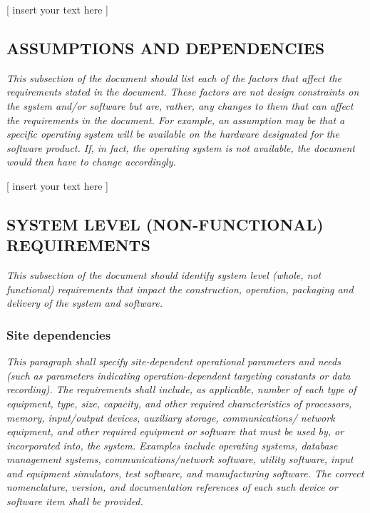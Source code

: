 \documentclass[twoside,letterpaper]{article}
\begin{document}
[ insert your text here ]

\subsection[ASSUMPTIONS AND DEPENDENCIES]{\rmfamily\bfseries ASSUMPTIONS AND
DEPENDENCIES}
\hypertarget{RefHeading18059017292}{}{\itshape
This subsection of the document should list each of the factors
that affect the requirements stated in the document. These factors
are not design constraints on the system and/or software but are,
rather, any changes to them that can affect the requirements in the
document. For example, an assumption may be that a specific
operating system will be available on the hardware designated for
the software product. If, in fact, the operating system is not available,
the document would then have to change accordingly.}

[ insert your text here ]

\subsection[SYSTEM LEVEL (NON{}-FUNCTIONAL) REQUIREMENTS]{\rmfamily\bfseries
SYSTEM LEVEL (NON-FUNCTIONAL) REQUIREMENTS}
\hypertarget{RefHeading18259017292}{}{\itshape
This subsection of the document should identify system level (whole,
not functional) requirements that impact the
construction, operation, packaging and delivery of the system and software.}

\subsubsection[Site dependencies]{\rmfamily\bfseries Site dependencies}
\hypertarget{RefHeading18459017292}{}{
{\textit{This paragraph shall specify site-dependent operational
parameters and needs (such as parameters indicating operation-dependent
targeting constants or data recording).}}
{\textit{The requirements shall include, as applicable, number of
each type of equipment, type, size, capacity, and other required
characteristics of processors, memory, input/output devices, auxiliary
storage, communications/ network equipment, and other required
equipment or software that must be used by, or incorporated into,
the system. Examples include operating systems, database management
systems, communications/network software, utility software, input
and equipment simulators, test software, and manufacturing software. The
correct nomenclature, version, and documentation references of each
such device or software item shall be provided.}}}
\end{document}

